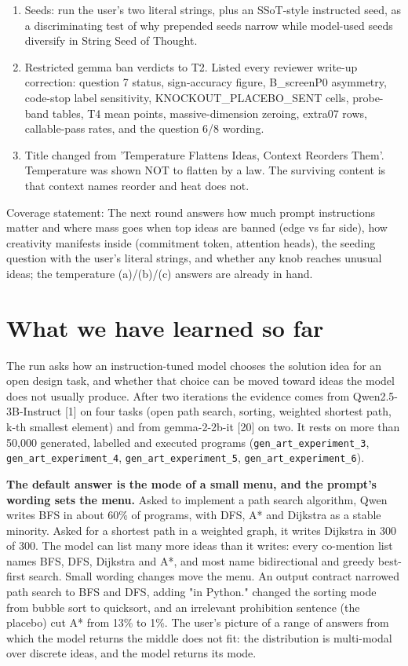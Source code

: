 \documentclass[11pt,letterpaper]{article}
\begin{document}
\begin{enumerate}
\item Seeds: run the user's two literal strings, plus an SSoT-style instructed seed, as a discriminating test of why prepended seeds narrow while model-used seeds diversify in String Seed of Thought.

\item Restricted gemma ban verdicts to T2. Listed every reviewer write-up correction: question 7 status, sign-accuracy figure, B\_screenP0 asymmetry, code-stop label sensitivity, KNOCKOUT\_PLACEBO\_SENT cells, probe-band tables, T4 mean points, massive-dimension zeroing, extra07 rows, callable-pass rates, and the question 6/8 wording.

\item Title changed from 'Temperature Flattens Ideas, Context Reorders Them'. Temperature was shown NOT to flatten by a law. The surviving content is that context names reorder and heat does not.

\end{enumerate}

Coverage statement: The next round answers how much prompt instructions matter and where mass goes when top ideas are banned (edge vs far side), how creativity manifests inside (commitment token, attention heads), the seeding question with the user's literal strings, and whether any knob reaches unusual ideas; the temperature (a)/(b)/(c) answers are already in hand.
\section{What we have learned so far}
The run asks how an instruction-tuned model chooses the solution idea for an open design task, and whether that choice can be moved toward ideas the model does not usually produce. After two iterations the evidence comes from Qwen2.5-3B-Instruct [1] on four tasks (open path search, sorting, weighted shortest path, k-th smallest element) and from gemma-2-2b-it [20] on two. It rests on more than 50,000 generated, labelled and executed programs (\texttt{gen\_\allowbreak{}art\_\allowbreak{}experiment\_\allowbreak{}3}, \texttt{gen\_\allowbreak{}art\_\allowbreak{}experiment\_\allowbreak{}4}, \texttt{gen\_\allowbreak{}art\_\allowbreak{}experiment\_\allowbreak{}5}, \texttt{gen\_\allowbreak{}art\_\allowbreak{}experiment\_\allowbreak{}6}).

\textbf{The default answer is the mode of a small menu, and the prompt's wording sets the menu.} Asked to implement a path search algorithm, Qwen writes BFS in about 60\% of programs, with DFS, A* and Dijkstra as a stable minority. Asked for a shortest path in a weighted graph, it writes Dijkstra in 300 of 300. The model can list many more ideas than it writes: every co-mention list names BFS, DFS, Dijkstra and A*, and most name bidirectional and greedy best-first search. Small wording changes move the menu. An output contract narrowed path search to BFS and DFS, adding "in Python." changed the sorting mode from bubble sort to quicksort, and an irrelevant prohibition sentence (the placebo) cut A* from 13\% to 1\%. The user's picture of a range of answers from which the model returns the middle does not fit: the distribution is multi-modal over discrete ideas, and the model returns its mode.
\end{document}

